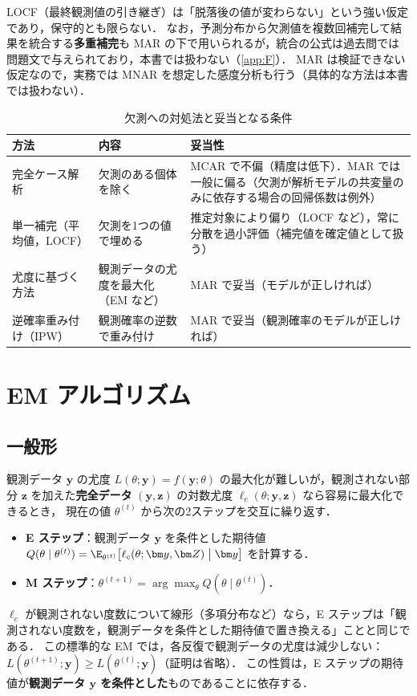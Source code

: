 \Youchui LOCF（最終観測値の引き継ぎ）は「脱落後の値が変わらない」という強い仮定であり，保守的とも限らない．
なお，予測分布から欠測値を複数回補完して結果を統合する\textbf{多重補完}も MAR の下で用いられるが，統合の公式は過去問では問題文で与えられており，本書では扱わない（\cref{app:F}）．
MAR は検証できない仮定なので，実務では MNAR を想定した感度分析も行う（具体的な方法は本書では扱わない）．

\begin{table}[htbp]
\centering\small
\caption{欠測への対処法と妥当となる条件}\label{tab:16-methods}
\begin{tabular}{@{}lL{48mm}L{52mm}@{}}
\toprule
方法 & 内容 & 妥当性\\
\midrule
完全ケース解析 & 欠測のある個体を除く & MCAR で不偏（精度は低下）．MAR では一般に偏る（欠測が解析モデルの共変量のみに依存する場合の回帰係数は例外）\\
単一補完（平均値，LOCF） & 欠測を1つの値で埋める & 推定対象により偏り（LOCF など），常に分散を過小評価（補完値を確定値として扱う）\\
尤度に基づく方法 & 観測データの尤度を最大化（EM など） & MAR で妥当（モデルが正しければ）\\
逆確率重み付け（IPW） & 観測確率の逆数で重み付け & MAR で妥当（観測確率のモデルが正しければ）\\
\bottomrule
\end{tabular}
\end{table}

\section{EM アルゴリズム}\label{sec:16-em}
\Hissu
\subsection{一般形}
観測データ $\bm y$ の尤度 $L(\theta;\bm y)=f(\bm y;\theta)$ の最大化が難しいが，観測されない部分 $\bm z$ を加えた\textbf{完全データ} $(\bm y,\bm z)$ の対数尤度 $\ell_c(\theta;\bm y,\bm z)$ なら容易に最大化できるとき，
現在の値 $\theta^{(t)}$ から次の2ステップを交互に繰り返す．
\begin{itemize}
\item \textbf{E ステップ}：観測データ $\bm y$ を条件とした期待値 $Q(\theta\mid\theta^{(t)})=\E_{\theta^{(t)}}\bigl[\ell_c(\theta;\bm y,\bm Z)\bigm|\bm y\bigr]$ を計算する．
\item \textbf{M ステップ}：$\theta^{(t+1)}=\arg\max_\theta Q(\theta\mid\theta^{(t)})$．
\end{itemize}
$\ell_c$ が観測されない度数について線形（多項分布など）なら，E ステップは「観測されない度数を，観測データを条件とした期待値で置き換える」ことと同じである．
この標準的な EM では，各反復で観測データの尤度は減少しない：$L(\theta^{(t+1)};\bm y)\ge L(\theta^{(t)};\bm y)$（証明は省略）．
この性質は，E ステップの期待値が\textbf{観測データ $\bm y$ を条件とした}ものであることに依存する．

